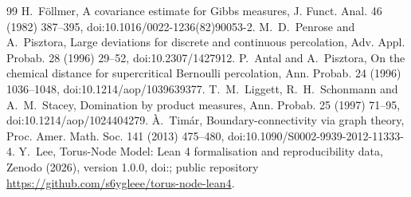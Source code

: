 \begin{thebibliography}{99}
 H.~F\"ollmer, A covariance estimate for Gibbs measures, J. Funct. Anal. 46 (1982) 387--395, doi:10.1016/0022-1236(82)90053-2.
 M.~D.~Penrose and A.~Pisztora, Large deviations for discrete and continuous percolation, Adv. Appl. Probab. 28 (1996) 29--52, doi:10.2307/1427912.
 P.~Antal and A.~Pisztora, On the chemical distance for supercritical Bernoulli percolation, Ann. Probab. 24 (1996) 1036--1048, doi:10.1214/aop/1039639377.
 T.~M.~Liggett, R.~H.~Schonmann and A.~M.~Stacey, Domination by product measures, Ann. Probab. 25 (1997) 71--95, doi:10.1214/aop/1024404279.
 \`A.~Tim\'ar, Boundary-connectivity via graph theory, Proc. Amer. Math. Soc. 141 (2013) 475--480, doi:10.1090/S0002-9939-2012-11333-4.
 Y.~Lee, Torus-Node Model: Lean 4 formalisation and reproducibility data, Zenodo (2026), version 1.0.0, doi:\href{https://doi.org/\ZenodoDOI}{\ZenodoDOI}; public repository \url{https://github.com/s6ygleee/torus-node-lean4}.
\end{thebibliography}
